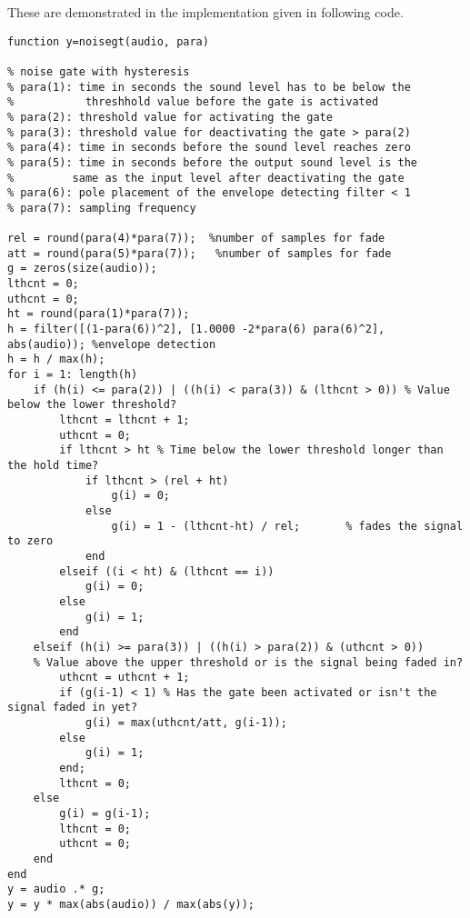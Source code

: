 \documentclass[10pt,a4paper,oneside]{article}
\begin{document}
These are demonstrated in the implementation given in following code.
\begin{lstlisting}
function y=noisegt(audio, para)

% noise gate with hysteresis
% para(1): time in seconds the sound level has to be below the 
%		    threshhold value before the gate is activated
% para(2): threshold value for activating the gate
% para(3): threshold value for deactivating the gate > para(2)
% para(4): time in seconds before the sound level reaches zero
% para(5): time in seconds before the output sound level is the 
%		  same as the input level after deactivating the gate
% para(6): pole placement of the envelope detecting filter < 1
% para(7): sampling frequency

rel = round(para(4)*para(7));  %number of samples for fade 
att = round(para(5)*para(7));   %number of samples for fade 
g = zeros(size(audio));
lthcnt = 0;
uthcnt = 0;
ht = round(para(1)*para(7));
h = filter([(1-para(6))^2], [1.0000 -2*para(6) para(6)^2], abs(audio)); %envelope detection 
h = h / max(h);
for i = 1: length(h)
	if (h(i) <= para(2)) | ((h(i) < para(3)) & (lthcnt > 0)) % Value below the lower threshold?
		lthcnt = lthcnt + 1;		
		uthcnt = 0;
		if lthcnt > ht % Time below the lower threshold longer than the hold time?
			if lthcnt > (rel + ht) 
				g(i) = 0;
			else
				g(i) = 1 - (lthcnt-ht) / rel;		% fades the signal to zero
			end
		elseif ((i < ht) & (lthcnt == i))
			g(i) = 0;
		else
			g(i) = 1;
		end
	elseif (h(i) >= para(3)) | ((h(i) > para(2)) & (uthcnt > 0))	
	% Value above the upper threshold or is the signal being faded in?
		uthcnt = uthcnt + 1;
		if (g(i-1) < 1) % Has the gate been activated or isn't the signal faded in yet?
			g(i) = max(uthcnt/att, g(i-1));
		else
			g(i) = 1;
		end;
		lthcnt = 0;
	else
		g(i) = g(i-1);
		lthcnt = 0;
		uthcnt = 0;
	end
end
y = audio .* g;
y = y * max(abs(audio)) / max(abs(y));

\end{lstlisting}
\end{document}
